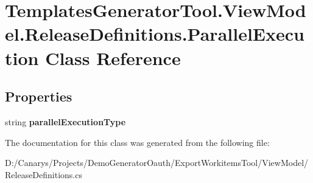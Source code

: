 \hypertarget{class_templates_generator_tool_1_1_view_model_1_1_release_definitions_1_1_parallel_execution}{}\section{Templates\+Generator\+Tool.\+View\+Model.\+Release\+Definitions.\+Parallel\+Execution Class Reference}
\label{class_templates_generator_tool_1_1_view_model_1_1_release_definitions_1_1_parallel_execution}
\subsection*{Properties}
\begin{DoxyCompactItemize}
\item 
\mbox{\label{class_templates_generator_tool_1_1_view_model_1_1_release_definitions_1_1_parallel_execution_a30b6d23389d44207df06ab725e83f84b}} 
string {\bfseries parallel\+Execution\+Type}
\end{DoxyCompactItemize}


The documentation for this class was generated from the following file\+:\begin{DoxyCompactItemize}
\item 
D\+:/\+Canarys/\+Projects/\+Demo\+Generator\+Oauth/\+Export\+Workitems\+Tool/\+View\+Model/Release\+Definitions.\+cs\end{DoxyCompactItemize}
